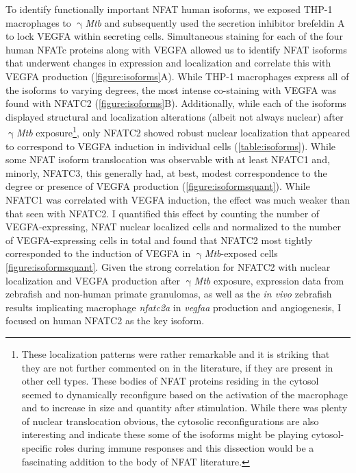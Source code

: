 To identify functionally important NFAT human isoforms, we exposed THP\hyp{}1 macrophages to $\upgamma$\textit{Mtb} and subsequently used the secretion inhibitor brefeldin A to lock VEGFA within secreting cells. Simultaneous staining for each of the four human NFATc proteins along with VEGFA allowed us to identify NFAT isoforms that underwent changes in expression and localization and correlate this with VEGFA production (\autoref{figure:isoforms}A). While THP\hyp{}1 macrophages express all of the isoforms to varying degrees, the most intense co\hyp{}staining with VEGFA was found with NFATC2 (\autoref{figure:isoforms}B). Additionally, while each of the isoforms displayed structural and localization alterations (albeit not always nuclear) after $\upgamma$\textit{Mtb} exposure\footnote{These localization patterns were rather remarkable and it is striking that they are not further commented on in the literature, if they are present in other cell types. These bodies of NFAT proteins residing in the cytosol seemed to dynamically reconfigure based on the activation of the macrophage and to increase in size and quantity after stimulation. While there was plenty of nuclear translocation obvious, the cytosolic reconfigurations are also interesting and indicate these some of the isoforms might be playing cytosol\hyp{}specific roles during immune responses and this dissection would be a fascinating addition to the body of NFAT literature.}, only NFATC2 showed robust nuclear localization that appeared to correspond to VEGFA induction in individual cells (\autoref{table:isoforms}). While some NFAT isoform translocation was observable with at least NFATC1 and, minorly, NFATC3, this generally had, at best, modest correspondence to the degree or presence of VEGFA production (\autoref{figure:isoformsquant}). While NFATC1 was correlated with VEGFA induction, the effect was much weaker than that seen with NFATC2. I quantified this effect by counting the number of VEGFA\hyp{}expressing, NFAT nuclear localized cells and normalized to the number of VEGFA\hyp{}expressing cells in total and found that NFATC2 most tightly corresponded to the induction of VEGFA in $\upgamma$\textit{Mtb}\hyp{}exposed cells \autoref{figure:isoformsquant}. Given the strong correlation for NFATC2 with nuclear localization and VEGFA production after $\upgamma$\textit{Mtb} exposure, expression data from zebrafish and non\hyp{}human primate granulomas, as well as the \textit{in vivo} zebrafish results implicating macrophage \textit{nfatc2a} in \textit{vegfaa} production and angiogenesis, I focused on human NFATC2 as the key isoform.

